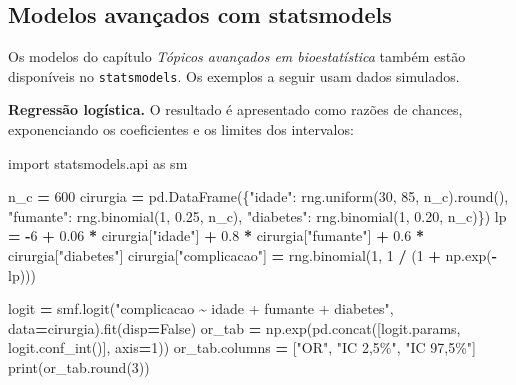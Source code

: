 \documentclass[
]{book}
\newenvironment{Shaded}{\begin{snugshade}}{\end{snugshade}}
\newcommand{\BuiltInTok}[1]{#1}
\newcommand{\DecValTok}[1]{\textcolor[rgb]{0.00,0.00,0.81}{#1}}
\newcommand{\FloatTok}[1]{\textcolor[rgb]{0.00,0.00,0.81}{#1}}
\newcommand{\ImportTok}[1]{#1}
\newcommand{\NormalTok}[1]{#1}
\newcommand{\OperatorTok}[1]{\textcolor[rgb]{0.81,0.36,0.00}{\textbf{#1}}}
\newcommand{\StringTok}[1]{\textcolor[rgb]{0.31,0.60,0.02}{#1}}
\newcommand{\VariableTok}[1]{\textcolor[rgb]{0.00,0.00,0.00}{#1}}
\begin{document}
\subsection{Modelos avançados com statsmodels}\label{modelos-avanuxe7ados-com-statsmodels}

Os modelos do capítulo \emph{Tópicos avançados em bioestatística} também estão disponíveis no \texttt{statsmodels}. Os exemplos a seguir usam dados simulados.

\textbf{Regressão logística.} O resultado é apresentado como razões de chances, exponenciando os coeficientes e os limites dos intervalos:

\begin{Shaded}
\begin{Highlighting}[]
\ImportTok{import}\NormalTok{ statsmodels.api }\ImportTok{as}\NormalTok{ sm}

\NormalTok{n\_c }\OperatorTok{=} \DecValTok{600}
\NormalTok{cirurgia }\OperatorTok{=}\NormalTok{ pd.DataFrame(\{}\StringTok{"idade"}\NormalTok{: rng.uniform(}\DecValTok{30}\NormalTok{, }\DecValTok{85}\NormalTok{, n\_c).}\BuiltInTok{round}\NormalTok{(),}
                         \StringTok{"fumante"}\NormalTok{: rng.binomial(}\DecValTok{1}\NormalTok{, }\FloatTok{0.25}\NormalTok{, n\_c),}
                         \StringTok{"diabetes"}\NormalTok{: rng.binomial(}\DecValTok{1}\NormalTok{, }\FloatTok{0.20}\NormalTok{, n\_c)\})}
\NormalTok{lp }\OperatorTok{=} \OperatorTok{{-}}\DecValTok{6} \OperatorTok{+} \FloatTok{0.06} \OperatorTok{*}\NormalTok{ cirurgia[}\StringTok{"idade"}\NormalTok{] }\OperatorTok{+} \FloatTok{0.8} \OperatorTok{*}\NormalTok{ cirurgia[}\StringTok{"fumante"}\NormalTok{] }\OperatorTok{+} \FloatTok{0.6} \OperatorTok{*}\NormalTok{ cirurgia[}\StringTok{"diabetes"}\NormalTok{]}
\NormalTok{cirurgia[}\StringTok{"complicacao"}\NormalTok{] }\OperatorTok{=}\NormalTok{ rng.binomial(}\DecValTok{1}\NormalTok{, }\DecValTok{1} \OperatorTok{/}\NormalTok{ (}\DecValTok{1} \OperatorTok{+}\NormalTok{ np.exp(}\OperatorTok{{-}}\NormalTok{lp)))}

\NormalTok{logit }\OperatorTok{=}\NormalTok{ smf.logit(}\StringTok{"complicacao \textasciitilde{} idade + fumante + diabetes"}\NormalTok{, data}\OperatorTok{=}\NormalTok{cirurgia).fit(disp}\OperatorTok{=}\VariableTok{False}\NormalTok{)}
\NormalTok{or\_tab }\OperatorTok{=}\NormalTok{ np.exp(pd.concat([logit.params, logit.conf\_int()], axis}\OperatorTok{=}\DecValTok{1}\NormalTok{))}
\NormalTok{or\_tab.columns }\OperatorTok{=}\NormalTok{ [}\StringTok{"OR"}\NormalTok{, }\StringTok{"IC 2,5\%"}\NormalTok{, }\StringTok{"IC 97,5\%"}\NormalTok{]}
\BuiltInTok{print}\NormalTok{(or\_tab.}\BuiltInTok{round}\NormalTok{(}\DecValTok{3}\NormalTok{))}
\end{Highlighting}
\end{Shaded}
\end{document}
